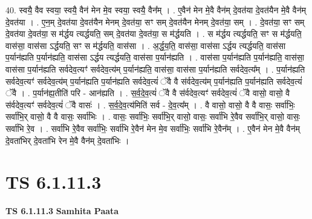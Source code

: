 \documentclass[17pt]{extarticle}
\begin{document}
40. स्वयै॒ वैव स्वया॒ स्वयै॒ वैन॑ मेन मे॒व स्वया॒ स्वयै॒ वैन᳚म् । . ए॒वैन॑ मेन मे॒वै वैन॑म् दे॒वत॑या दे॒वत॑यैन मे॒वै वैन॑म् दे॒वत॑या । . ए॒न॒म् दे॒वत॑या दे॒वत॑यैन मेनम् दे॒वत॑या॒ सꣳ सम् दे॒वत॑यैन मेनम् दे॒वत॑या॒ सम् । . दे॒वत॑या॒ सꣳ सम् दे॒वत॑या दे॒वत॑या॒ स म॑र्द्धय त्यर्द्धयति॒ सम् दे॒वत॑या दे॒वत॑या॒ स म॑र्द्धयति । . स म॑र्द्धय त्यर्द्धयति॒ सꣳ स म॑र्द्धयति॒ वास॑सा॒ वास॑सा ऽर्द्धयति॒ सꣳ स म॑र्द्धयति॒ वास॑सा । . अ॒र्द्ध॒य॒ति॒ वास॑सा॒ वास॑सा ऽर्द्धय त्यर्द्धयति॒ वास॑सा प॒र्यान॑ह्यति प॒र्यान॑ह्यति॒ वास॑सा ऽर्द्धय त्यर्द्धयति॒ वास॑सा प॒र्यान॑ह्यति । . वास॑सा प॒र्यान॑ह्यति प॒र्यान॑ह्यति॒ वास॑सा॒ वास॑सा प॒र्यान॑ह्यति सर्वदेव॒त्यꣳ॑ सर्वदेव॒त्य॑म् प॒र्यान॑ह्यति॒ वास॑सा॒ वास॑सा प॒र्यान॑ह्यति सर्वदेव॒त्य᳚म् । . प॒र्यान॑ह्यति सर्वदेव॒त्यꣳ॑ सर्वदेव॒त्य॑म् प॒र्यान॑ह्यति प॒र्यान॑ह्यति सर्वदेव॒त्यं॑ ॅवै वै स॑र्वदेव॒त्य॑म् प॒र्यान॑ह्यति प॒र्यान॑ह्यति सर्वदेव॒त्यं॑ ॅवै । . प॒र्यान॑ह्य॒तीति॑ परि - आन॑ह्यति । . स॒र्व॒दे॒व॒त्यं॑ ॅवै वै स॑र्वदेव॒त्यꣳ॑ सर्वदेव॒त्यं॑ ॅवै वासो॒ वासो॒ वै स॑र्वदेव॒त्यꣳ॑ सर्वदेव॒त्यं॑ ॅवै वासः॑ । . स॒र्व॒दे॒व॒त्य॑मिति॑ सर्व - दे॒व॒त्य᳚म् । . वै वासो॒ वासो॒ वै वै वासः॒ सर्वा॑भिः॒ सर्वा॑भि॒र् वासो॒ वै वै वासः॒ सर्वा॑भिः । . वासः॒ सर्वा॑भिः॒ सर्वा॑भि॒र् वासो॒ वासः॒ सर्वा॑भि रे॒वैव सर्वा॑भि॒र् वासो॒ वासः॒ सर्वा॑भि रे॒व । . सर्वा॑भि रे॒वैव सर्वा॑भिः॒ सर्वा॑भि रे॒वैन॑ मेन मे॒व सर्वा॑भिः॒ सर्वा॑भि रे॒वैन᳚म् । . ए॒वैन॑ मेन मे॒वै वैन॑म् दे॒वता॑भिर् दे॒वता॑भि रेन मे॒वै वैन॑म् दे॒वता॑भिः । \newline
\pagebreak
{}

\section{ TS 6.1.11.3 }

\textbf{TS 6.1.11.3 } \newline
\textbf{Samhita Paata} \newline
\end{document}
